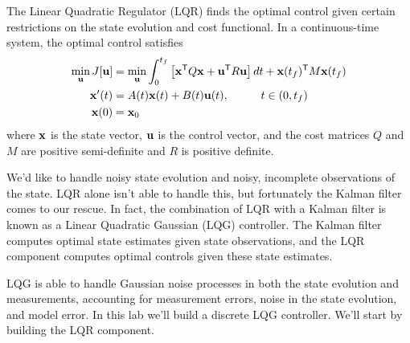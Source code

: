 \newcommand{\mbf}{\mathbf}
\newcommand{\s}{\mathbf s}


\label{lab:LQG}


The Linear Quadratic Regulator (LQR) finds the optimal control given certain restrictions on the state evolution and cost functional.
In a continuous-time system, the optimal control satisfies
\begin{align*}
\min_{\mathbf{u}} J[\mathbf{u}] &= \min_{\mathbf{u}} \int_0^{t_f} \left[\mathbf{x}^{\mathsf T} Q \mathbf{x} + \mathbf{u}^{\mathsf T} R \mathbf{u}\right] dt + \mathbf{x}(t_f)^{\mathsf T} M \mathbf{x}(t_f)\\
\mathbf{x}'(t) &= A(t)  \mathbf{x}(t) + B(t) \mathbf{u}(t), \hspace{1cm} t \in (0, t_f)\\
\mathbf{x}(0) &= \mathbf{x}_0
\end{align*}
where $\mathbf{x}$ is the state vector, $\mathbf{u}$ is the control vector, and the cost matrices $Q$ and $M$ are positive semi-definite and $R$ is positive definite.

We'd like to handle noisy state evolution and noisy, incomplete observations of the state.
LQR alone isn't able to handle this, but fortunately the Kalman filter comes to our rescue.
In fact, the combination of LQR with a Kalman filter is known as a Linear Quadratic Gaussian (LQG) controller.
The Kalman filter computes optimal state estimates given state observations, and the LQR component computes optimal controls given these state estimates.

LQG is able to handle Gaussian noise processes in both the state evolution and measurements, accounting for measurement errors, noise in the state evolution, and model error.
In this lab we'll build a discrete LQG controller.
We'll start by building the LQR component.

